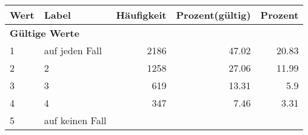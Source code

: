      \begin{longtable}{lXrrr}
     \toprule
     \textbf{Wert} & \textbf{Label} & \textbf{Häufigkeit} & \textbf{Prozent(gültig)} & \textbf{Prozent} \\
     \endhead
     \midrule
     \multicolumn{5}{l}{\textbf{Gültige Werte}}\\

     1 &
     \multicolumn{1}{X}{ auf jeden Fall   } &


       \num{2186} &
       \num[round-mode=places,round-precision=2]{47,02} &
         \num[round-mode=places,round-precision=2]{20,83} \\

     2 &
     \multicolumn{1}{X}{ 2   } &


       \num{1258} &
       \num[round-mode=places,round-precision=2]{27,06} &
         \num[round-mode=places,round-precision=2]{11,99} \\

     3 &
     \multicolumn{1}{X}{ 3   } &


       \num{619} &
       \num[round-mode=places,round-precision=2]{13,31} &
         \num[round-mode=places,round-precision=2]{5,9} \\

     4 &
     \multicolumn{1}{X}{ 4   } &


       \num{347} &
       \num[round-mode=places,round-precision=2]{7,46} &
         \num[round-mode=places,round-precision=2]{3,31} \\

     5 &
     \multicolumn{1}{X}{ auf keinen Fall   } &



\end{longtable}
